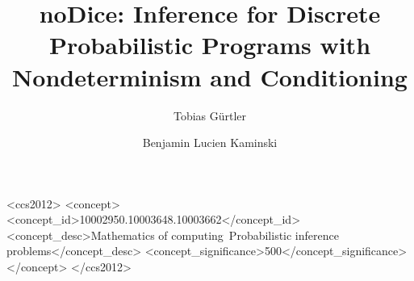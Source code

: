 \documentclass[acmsmall, nonacm, screen,svgnames,x11names]{acmart}\settopmatter{}
\theoremstyle{acmdefinition}
\begin{document}
	
	\title
	[noDice: Inference for Discrete Probabilistic Programs with Nondeterminism and Conditioning]
	{noDice: Inference for Discrete Probabilistic Programs with Nondeterminism and Conditioning}
	
	\author{Tobias Gürtler}
	
	\author{Benjamin Lucien Kaminski}
	
	
	
	
	
\begin{CCSXML}
	<ccs2012>
	<concept>
	<concept_id>10002950.10003648.10003662</concept_id>
	<concept_desc>Mathematics of computing~Probabilistic inference problems</concept_desc>
	<concept_significance>500</concept_significance>
	</concept>
	</ccs2012>
\end{CCSXML}

	
	
	
	
	\maketitle
	
\end{document}
